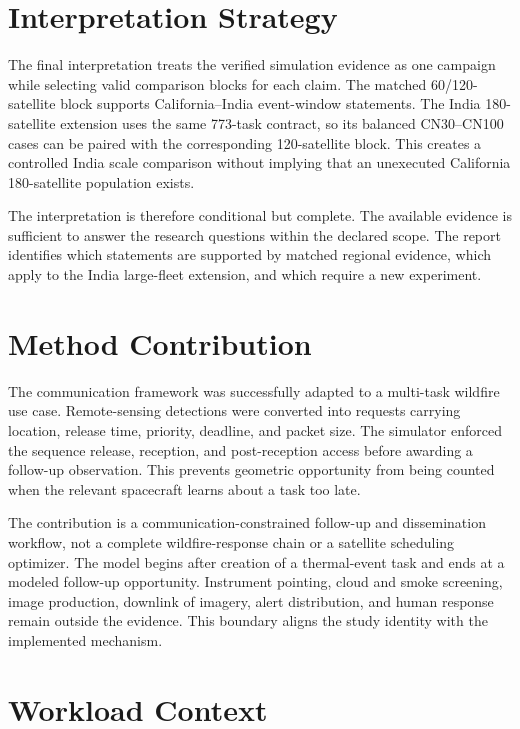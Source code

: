 \section{Interpretation Strategy}

The final interpretation treats the verified simulation evidence as one campaign while selecting valid comparison blocks for each claim. The matched 60/120-satellite block supports California--India event-window statements. The India 180-satellite extension uses the same 773-task contract, so its balanced CN30--CN100 cases can be paired with the corresponding 120-satellite block. This creates a controlled India scale comparison without implying that an unexecuted California 180-satellite population exists.

The interpretation is therefore conditional but complete. The available evidence is sufficient to answer the research questions within the declared scope. The report identifies which statements are supported by matched regional evidence, which apply to the India large-fleet extension, and which require a new experiment.

\section{Method Contribution}

The communication framework was successfully adapted to a multi-task wildfire use case. Remote-sensing detections were converted into requests carrying location, release time, priority, deadline, and packet size. The simulator enforced the sequence release, reception, and post-reception access before awarding a follow-up observation. This prevents geometric opportunity from being counted when the relevant spacecraft learns about a task too late.

The contribution is a communication-constrained follow-up and dissemination workflow, not a complete wildfire-response chain or a satellite scheduling optimizer. The model begins after creation of a thermal-event task and ends at a modeled follow-up opportunity. Instrument pointing, cloud and smoke screening, image production, downlink of imagery, alert distribution, and human response remain outside the evidence. This boundary aligns the study identity with the implemented mechanism.

\section{Workload Context}

